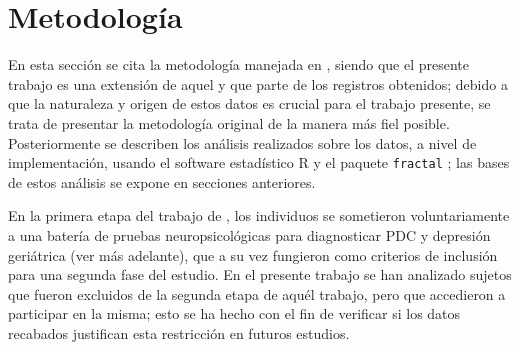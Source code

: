 \documentclass[12pt,a4paper]{mitthesis}
\begin{document}

\chapter{Metodolog\'ia}

En esta secci\'on se cita la metodolog\'ia manejada en \cite{VazquezTagle16}, siendo que el 
presente trabajo es una extensi\'on de aquel y que parte de los registros obtenidos; debido a que 
la naturaleza y origen de estos datos es crucial para el trabajo presente, se trata de presentar la 
metodolog\'ia original de la manera m\'as fiel posible.
Posteriormente se describen los an\'alisis realizados sobre los datos, a nivel de implementaci\'on, 
usando el software estad\'istico R y el paquete \texttt{fractal} \cite{R_citar,R_fractal}; las 
bases de estos an\'alisis se expone en secciones anteriores.

En la primera etapa del trabajo de \cite{VazquezTagle16}, los individuos se sometieron 
voluntariamente a una bater\'ia de pruebas neuropsicol\'ogicas para diagnosticar PDC y depresi\'on 
geri\'atrica (ver m\'as adelante), que a su vez fungieron como criterios de inclusi\'on para una 
segunda fase del estudio.
En el presente trabajo se han analizado sujetos que fueron excluidos de la segunda etapa de aqu\'el
trabajo, pero que accedieron a participar en la misma; esto se ha hecho con el fin de verificar si 
los datos recabados justifican esta restricci\'on en futuros estudios.


\end{document}
